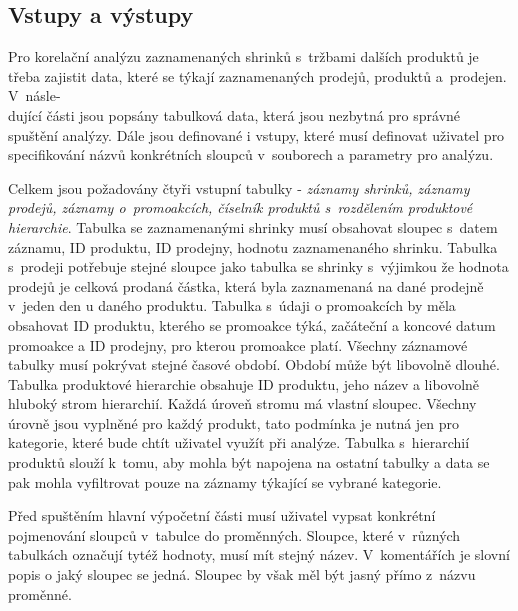 \subsection{Vstupy a výstupy}
\label{ss:vstupyvystupy}

Pro korelační analýzu zaznamenaných shrinků s~tržbami dalších produktů je třeba zajistit data, které se týkají zaznamenaných prodejů, produktů a~prodejen. V~násle-\\dující části jsou popsány tabulková data, která jsou nezbytná pro správné spuštění analýzy. Dále jsou definované i vstupy, které musí definovat uživatel pro specifikování názvů konkrétních sloupců v~souborech a parametry pro analýzu.

Celkem jsou požadovány čtyři vstupní tabulky - \emph{záznamy shrinků, záznamy prodejů, záznamy o~promoakcích, číselník produktů s~rozdělením produktové hierarchie}. %
Tabulka se zaznamenanými shrinky musí obsahovat sloupec s~datem záznamu, ID produktu, ID prodejny, hodnotu zaznamenaného shrinku. Tabulka s~prodeji potřebuje stejné sloupce jako tabulka se shrinky s~výjimkou že hodnota prodejů je celková prodaná částka, která byla zaznamenaná na dané prodejně v~jeden den u daného produktu. Tabulka s~údaji o promoakcích by měla obsahovat ID produktu, kterého se promoakce týká, začáteční a koncové datum promoakce a ID prodejny, pro kterou promoakce platí.
Všechny záznamové tabulky musí pokrývat stejné časové období. Období může být libovolně dlouhé.
Tabulka produktové hierarchie obsahuje ID produktu, jeho název a libovolně hluboký strom hierarchií. Každá úroveň stromu má vlastní sloupec. Všechny úrovně jsou vyplněné pro každý produkt, tato podmínka je nutná jen pro kategorie, které bude chtít uživatel využít při analýze. 
Tabulka s~hierarchií produktů slouží k~tomu, aby mohla být napojena na ostatní tabulky a data se pak mohla vyfiltrovat pouze na záznamy týkající se vybrané kategorie.

Před spuštěním hlavní výpočetní části musí uživatel vypsat konkrétní pojmenování sloupců v~tabulce do proměnných. Sloupce, které v~různých tabulkách označují tytéž hodnoty, musí mít stejný název. 
 V~komentářích je slovní popis o jaký sloupec se jedná. Sloupec by však měl být jasný přímo z~názvu proměnné.

